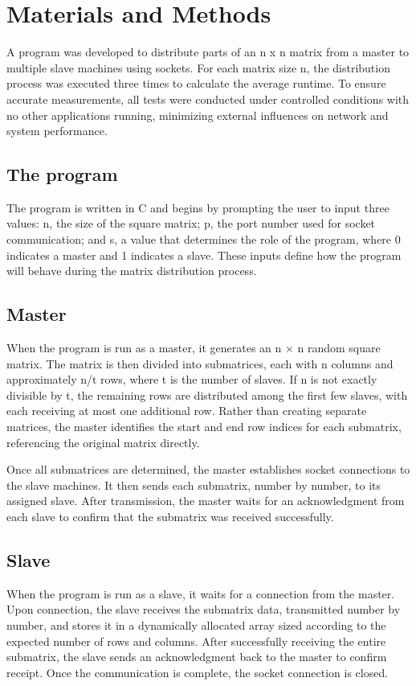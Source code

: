 \documentclass[journal]{./IEEE/IEEEtran}
\begin{document}
\section{Materials and Methods}
A program was developed to distribute parts of an n x n matrix from a master to multiple slave machines using sockets. For each matrix size n, the distribution process was executed three times to calculate the average runtime. To ensure accurate measurements, all tests were conducted under controlled conditions with no other applications running, minimizing external influences on network and system performance.


\subsection{The program}
The program is written in C and begins by prompting the user to input three values: n, the size of the square matrix; p, the port number used for socket communication; and s, a value that determines the role of the program, where 0 indicates a master and 1 indicates a slave. These inputs define how the program will behave during the matrix distribution process.



\subsection{Master}
When the program is run as a master, it generates an n × n random square matrix. The matrix is then divided into submatrices, each with n columns and approximately n/t rows, where t is the number of slaves. If n is not exactly divisible by t, the remaining rows are distributed among the first few slaves, with each receiving at most one additional row. Rather than creating separate matrices, the master identifies the start and end row indices for each submatrix, referencing the original matrix directly.

Once all submatrices are determined, the master establishes socket connections to the slave machines. It then sends each submatrix, number by number, to its assigned slave. After transmission, the master waits for an acknowledgment from each slave to confirm that the submatrix was received successfully.

\subsection{Slave}
When the program is run as a slave, it waits for a connection from the master. Upon connection, the slave receives the submatrix data, transmitted number by number, and stores it in a dynamically allocated array sized according to the expected number of rows and columns. After successfully receiving the entire submatrix, the slave sends an acknowledgment back to the master to confirm receipt. Once the communication is complete, the socket connection is closed.
\end{document}
